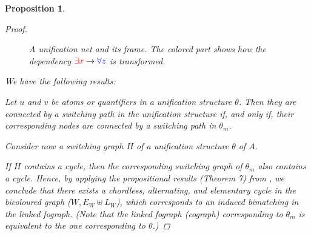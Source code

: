 \documentclass[conference,twosided,10pt]{IEEEtran}
\newtheorem{proposition}[thm]{Proposition}
\theoremstyle{definition}
\newcommand{\cor}{\vee}
\newcommand{\cand}{\wedge}
\begin{document}
\begin{proposition}
\begin{proof}
\begin{figure}
\begin{center}

\caption{A unification net and its frame. The colored part shows how the
dependency ${\color{red} \exists x} \rightarrow {\color{blue} \forall z}$ is
transformed.}
\end{center}
\end{figure}

We have the following results: 

Let $u$ and $v$ be atoms or quantifiers in a unification structure $\theta$. Then they are connected by a switching path in the unification structure if, and only if, their corresponding nodes are connected by a switching path in $\theta_m$.

Consider now a switching graph $H$ of a unification structure $\theta$ of $A$.

If $H$ contains a cycle, then the corresponding switching graph of $\theta_m$
also contains a cycle. Hence, by applying the propositional results (Theorem 7)
from \cite{retore:03}, we conclude that there exists a chordless, alternating, and elementary cycle in the bicoloured graph ($W, E_W \uplus L_W$), which corresponds to an induced bimatching in the linked fograph. (Note that the linked fograph (cograph) corresponding to $\theta_m$ is equivalent to the one corresponding to $\theta$.)

\end{proof}
\end{proposition}
\end{document}
